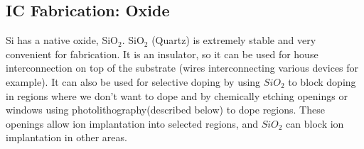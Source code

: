\subsection{IC Fabrication: Oxide}
Si has a native oxide, SiO$_2$.  SiO$_2$ (Quartz) is extremely stable and very convenient for fabrication.  It is an insulator, so it can be used for house interconnection on top of the substrate (wires interconnecting various devices for example).  It can also be used for selective doping by using $SiO_2$ to block doping in regions where we don't want to dope and by chemically etching openings or windows using photolithography(described below) to dope regions.  These openings allow ion implantation into selected regions, and $SiO_2$ can block ion implantation in other areas.

